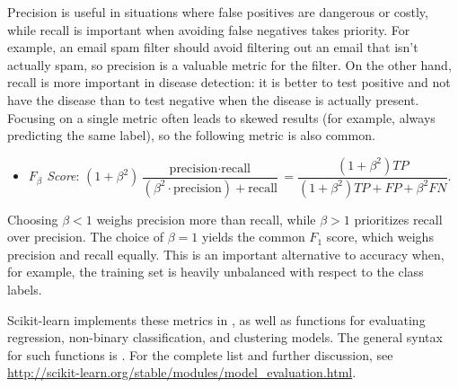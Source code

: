 Precision is useful in situations where false positives are dangerous or costly, while recall is important when avoiding false negatives takes priority.
For example, an email spam filter should avoid filtering out an email that isn't actually spam, so precision is a valuable metric for the filter.
On the other hand, recall is more important in disease detection: it is better to test positive and not have the disease than to test negative when the disease is actually present.
Focusing on a single metric often leads to skewed results (for example, always predicting the same label), so the following metric is also common.
\begin{itemize}
\item \emph{$F_\beta$ Score}: $(1 + \beta^2)
\dfrac{\text{precision}\cdot\text{recall}}{(\beta^2\cdot\text{precision}) + \text{recall}} = \dfrac{(1 + \beta^2)TP}{(1+\beta^2)TP + FP + \beta^2 FN}$.
\end{itemize}

Choosing $\beta < 1$ weighs precision more than recall, while $\beta > 1$ prioritizes recall over precision.
The choice of $\beta = 1$ yields the common $F_1$ score, which weighs precision and recall equally.
This is an important alternative to accuracy when, for example, the training set is heavily unbalanced with respect to the class labels.

Scikit-learn implements these metrics in , as well as functions for evaluating regression, non-binary classification, and clustering models.
The general syntax for such functions is .
For the complete list and further discussion, see \url{http://scikit-learn.org/stable/modules/model_evaluation.html}.

